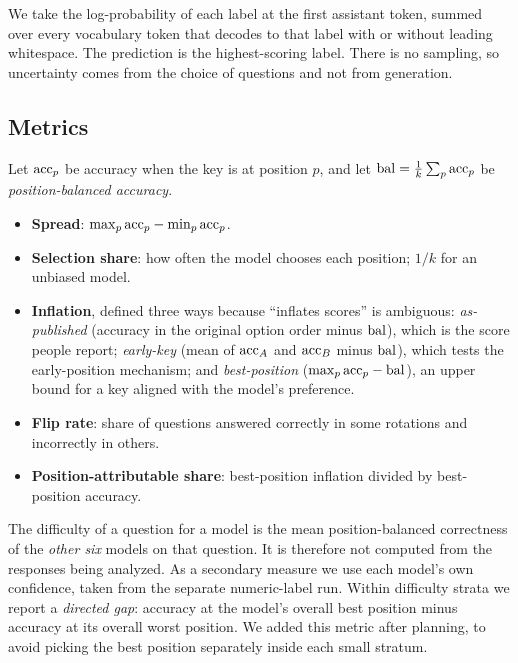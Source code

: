 We take the log-probability of each label at the first assistant token, summed over every vocabulary token that decodes to that label with or without leading whitespace.
The prediction is the highest-scoring label.
There is no sampling, so uncertainty comes from the choice of questions and not from generation.

\subsection{Metrics}
\label{sec:metrics}

Let $\mathrm{acc}_p$ be accuracy when the key is at position $p$, and let $\mathrm{bal} = \frac{1}{k}\sum_p \mathrm{acc}_p$ be \emph{position-balanced accuracy}.

\begin{itemize}[leftmargin=*,itemsep=0pt,topsep=0pt]
    \item \textbf{Spread}: $\max_p \mathrm{acc}_p - \min_p \mathrm{acc}_p$.
    \item \textbf{Selection share}: how often the model chooses each position; $1/k$ for an unbiased model.
    \item \textbf{Inflation}, defined three ways because ``inflates scores'' is ambiguous:
    \emph{as-published} (accuracy in the original option order minus $\mathrm{bal}$), which is the score people report;
    \emph{early-key} (mean of $\mathrm{acc}_A$ and $\mathrm{acc}_B$ minus $\mathrm{bal}$), which tests the early-position mechanism;
    and \emph{best-position} ($\max_p \mathrm{acc}_p - \mathrm{bal}$), an upper bound for a key aligned with the model's preference.
    \item \textbf{Flip rate}: share of questions answered correctly in some rotations and incorrectly in others.
    \item \textbf{Position-attributable share}: best-position inflation divided by best-position accuracy.
\end{itemize}

The difficulty of a question for a model is the mean position-balanced correctness of the \emph{other six} models on that question.
It is therefore not computed from the responses being analyzed.
As a secondary measure we use each model's own confidence, taken from the separate numeric-label run.
Within difficulty strata we report a \emph{directed gap}: accuracy at the model's overall best position minus accuracy at its overall worst position.
We added this metric after planning, to avoid picking the best position separately inside each small stratum.


